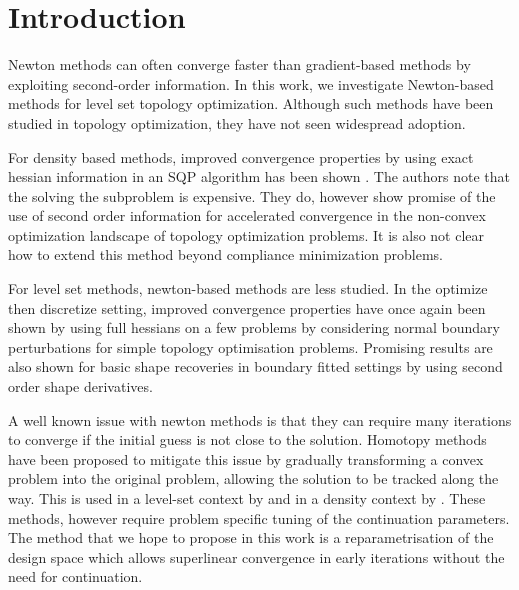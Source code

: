\section{Introduction}

Newton methods can often converge faster than gradient-based methods by exploiting second-order information. In this work, we investigate Newton-based methods for level set topology optimization. Although such methods have been studied in topology optimization, they have not seen widespread adoption.

For density based methods, improved convergence properties by using exact hessian information in an SQP algorithm has been shown \cite{RojasLabanda2016,RojasLabanda2017}. The authors note that the solving the subproblem is expensive. They do, however show promise of the use of second order information for accelerated convergence in the non-convex optimization landscape of topology optimization problems. It is also not clear how to extend this method beyond compliance minimization problems.

For level set methods, newton-based methods are less studied. In the optimize then discretize setting, improved convergence properties have once again been shown by using full hessians on a few problems \cite{Allaire2016} by considering normal boundary perturbations for simple topology optimisation problems.
Promising results are also shown for basic shape recoveries in boundary fitted settings \cite{Gangl2020,Etling2018} by using second order shape derivatives. 

A well known issue with newton methods is that they can require many iterations to converge if the initial guess is not close to the solution. Homotopy methods have been proposed to mitigate this issue by gradually transforming a convex problem into the original problem, allowing the solution to be tracked along the way. This is used in a level-set context by \cite{Gangl2024} and in a density context by \cite{Papadopoulos2021}. These methods, however require problem specific tuning of the continuation parameters. 
The method that we hope to propose in this work is a reparametrisation of the design space which allows superlinear convergence in early iterations without the need for continuation.
